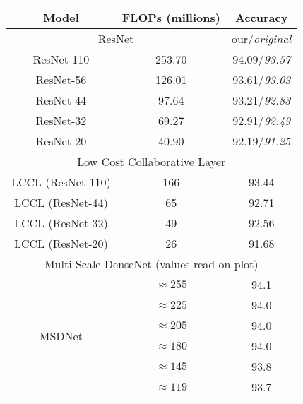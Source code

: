 
\begin{table}[h]
\centering
\begin{tabular}{|c||cc|}
\hline
Model                         & FLOPs (millions)   & Accuracy                    \\ \hline \hline
\multicolumn{2}{|c|}{ResNet \cite{DBLP:journals/corr/HeZRS15}}                       & our/\textit{original} \\ \hline
ResNet-110                    & 253.70              & 94.09/\textit{93.57}                 \\
ResNet-56                     & 126.01             & 93.61/\textit{93.03}                 \\
ResNet-44                     & 97.64              & 93.21/\textit{92.83}                 \\
ResNet-32                     & 69.27              & 92.91/\textit{92.49}                 \\
ResNet-20                     & 40.90               & 92.19/\textit{91.25}                 \\ \hline \hline
\multicolumn{3}{|c|}{Low Cost Collaborative Layer \cite{DBLP:journals/corr/DongHYY17}}                               \\ \hline
LCCL (ResNet-110)             & 166            & 93.44                       \\
LCCL (ResNet-44)              & 65                 & 92.71                       \\
LCCL (ResNet-32)              & 49                 & 92.56                       \\
LCCL (ResNet-20)              & 26                 & 91.68                       \\ \hline \hline
\multicolumn{3}{|c|}{Multi Scale DenseNet \cite{DBLP:journals/corr/HuangCLWMW17} (values read on plot)}                         \\ \hline
\multirow{10}{*}{MSDNet}      & $\approx 255$                & 94.1			\\
                              & $\approx 225$                & 94.0			\\
                              & $\approx 205$                & 94.0           \\
                              & $\approx 180$                & 94.0           \\
                              & $\approx 145$                & 93.8         \\
                              & $\approx 119$                & 93.7         \\

\end{tabular}
\end{table}
